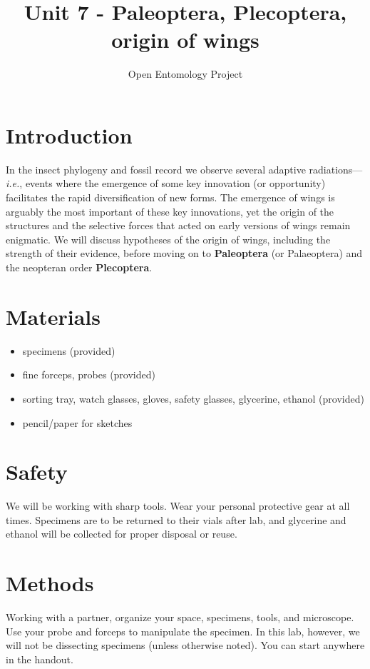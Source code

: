 \documentclass[letterpaper, 11pt]{article}
\title{Unit 7 - Paleoptera, Plecoptera, origin of wings}
\author{Open Entomology Project}
\begin{document}
\cleanlookdateon %
\maketitle
\thispagestyle{fancy}
\section*{Introduction}
In the insect phylogeny and fossil record we observe several adaptive radiations---\textit{i.e.}, events where the emergence of some key innovation (or opportunity) facilitates the rapid diversification of new forms. The emergence of wings is arguably the most important of these key innovations, yet the origin of the structures and the selective forces that acted on early versions of wings remain enigmatic. We will discuss hypotheses of the origin of wings, including the strength of their evidence, before moving on to \textbf{Paleoptera} (or Palaeoptera) and the neopteran order \textbf{Plecoptera}.

\section*{Materials}

\begin{itemize}
\item specimens (provided)
\item fine forceps, probes (provided)
\item sorting tray, watch glasses, gloves, safety glasses, glycerine, ethanol (provided)
\item pencil/paper for sketches
\end{itemize}

\section*{Safety}
We will be working with sharp tools. Wear your personal protective gear at all times. Specimens are to be returned to their vials after lab, and glycerine and ethanol will be collected for proper disposal or reuse.

\section*{Methods}
Working with a partner, organize your space, specimens, tools, and microscope. Use your probe and forceps to manipulate the specimen. In this lab, however, we will not be dissecting specimens (unless otherwise noted). You can start anywhere in the handout.
\end{document}
